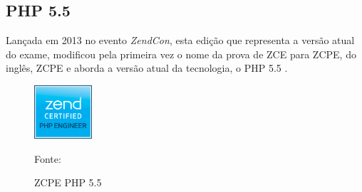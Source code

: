 \FloatBarrier 	%


\subsection{PHP 5.5}

Lançada em 2013 no evento \textit{ZendCon}, esta edição que representa a versão
atual do exame, modificou pela primeira vez o nome da prova de \acs{ZCE} para
\acs{ZCPE}, do inglês, \acl{ZCPE} e aborda a versão atual da tecnologia, o
PHP 5.5 \cite{entrevistaAriZCEBrasil}.

\begin{figure}[h!tb]
	\caption{ZCPE PHP 5.5}
	\label{fig:logoCertificationPHP55}

	\centering
	\includegraphics[width=0.19\textwidth]{images/logo/php5-5.png}

	\centering
	\footnotesize Fonte: 
\end{figure}

\FloatBarrier 	%

